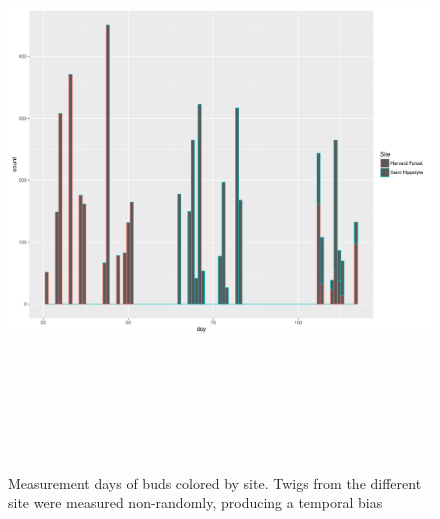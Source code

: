 \documentclass{article}\usepackage[]{graphicx}\usepackage[]{color}
\begin{document}
\begin{figure}[h!]
\includegraphics[width=15cm, height=15cm]{temp_bias_fig.pdf}\\
\caption{Measurement days of buds colored by site. Twigs from the different site were measured non-randomly, producing a temporal bias}
\end{figure}
\end{document}
